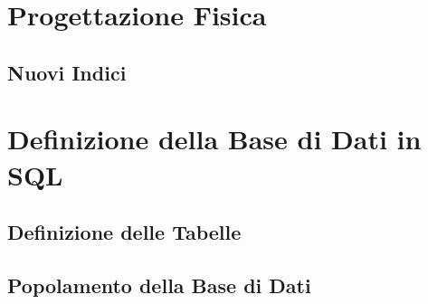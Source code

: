 \documentclass{article}
\begin{document}
% 
% 
% 
% 
% 
% 




\clearpage
\section{Progettazione Fisica}
\subsection{Nuovi Indici}



\clearpage
\section{Definizione della Base di Dati in SQL}
\subsection{Definizione delle Tabelle}
\subsection{Popolamento della Base di Dati}
\end{document}
